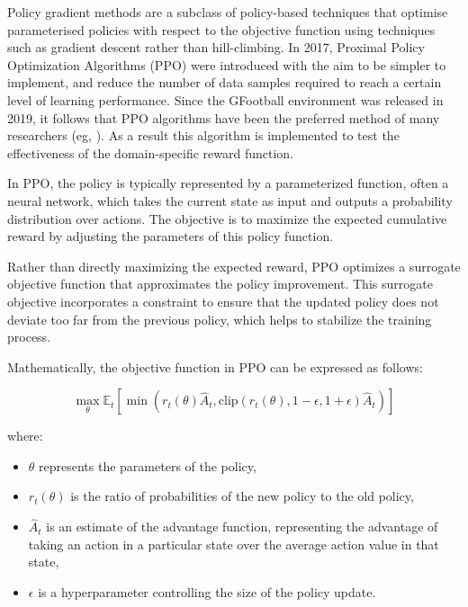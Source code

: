 \documentclass[11pt]{article}
\begin{document}
Policy gradient methods \cite{Peters2010} are a subclass of policy-based techniques that optimise parameterised policies with respect to the objective function using techniques such as gradient descent rather than hill-climbing. In 2017, Proximal Policy Optimization Algorithms (PPO) \cite{Schulman2017} were introduced with the aim to be simpler to implement, and reduce the number of data samples required to reach a certain level of learning performance. Since the GFootball environment was released in 2019, it follows that PPO algorithms have been the preferred method of many researchers (eg, \cite{Yu2022, Wen2022}). As a result this algorithm is implemented to test the effectiveness of the domain-specific reward function.

In PPO, the policy is typically represented by a parameterized function, often a neural network, which takes the current state as input and outputs a probability distribution over actions. The objective is to maximize the expected cumulative reward by adjusting the parameters of this policy function.

Rather than directly maximizing the expected reward, PPO optimizes a surrogate objective function that approximates the policy improvement. This surrogate objective incorporates a constraint to ensure that the updated policy does not deviate too far from the previous policy, which helps to stabilize the training process.

Mathematically, the objective function in PPO can be expressed as follows:

\[
\max_\theta \mathbb{E}_t \left[ \min \left( r_t(\theta) \hat{A}_t, \text{clip}\left( r_t(\theta), 1 - \epsilon, 1 + \epsilon \right) \hat{A}_t \right) \right]
\]

where:
\begin{itemize}

    \item  \( \theta \) represents the parameters of the policy,
    \item  \( r_t(\theta) \) is the ratio of probabilities of the new policy to the old policy,
    \item  \( \hat{A}_t \) is an estimate of the advantage function, representing the advantage of taking an action in a particular state over the average action value in that state,
    \item \( \epsilon \) is a hyperparameter controlling the size of the policy update.

\end{itemize}
\end{document}
